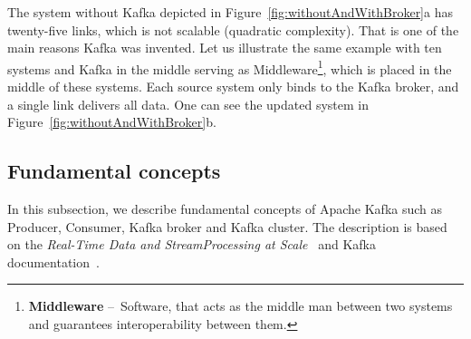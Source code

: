 The system without Kafka depicted in Figure~\ref{fig:withoutAndWithBroker}a has twenty-five links, which is not scalable (quadratic complexity).
That is one of the main reasons Kafka was invented.
Let us illustrate the same example with ten systems and Kafka in the middle serving as Middleware\footnote{\textbf{Middleware} \---\ Software, that acts as the middle man between two systems and guarantees interoperability between them.}, which is placed in the middle of these systems.
Each source system only binds to the Kafka broker, and a single link delivers all data. One can see the updated system in Figure~\ref{fig:withoutAndWithBroker}b.

\subsection{Fundamental concepts}

In this subsection, we describe fundamental concepts of Apache Kafka such as Producer, Consumer, Kafka broker and Kafka cluster.
The description is based on the \emph{Real-Time Data and StreamProcessing at Scale}~\cite{apacheKafkaDefinitiveGuide} and Kafka documentation~\cite{kafkaDocumentation}.

